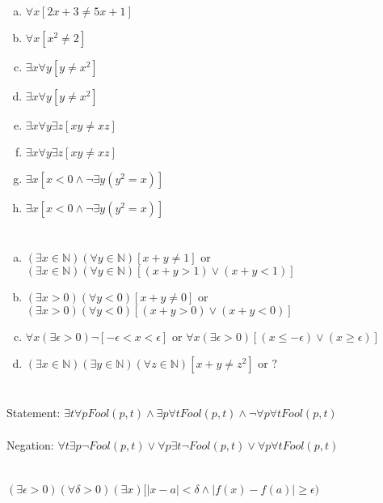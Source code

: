 \documentclass{article}
\begin{document}
\section{}

\begin{enumerate}[(a)]
\item $\forall x [2x + 3 \neq 5x + 1]$
\item $\forall x [x^2 \neq 2]$
\item $\exists x \forall y [y \neq x^2]$
\item $\exists x \forall y [y \neq x^2]$
\item $\exists x \forall y \exists z [xy \neq xz]$
\item $\exists x \forall y \exists z [xy \neq xz]$
\item $\exists x [x < 0 \wedge \neg \exists y (y^2 = x)]$
\item $\exists x [x < 0 \wedge \neg \exists y (y^2 = x)]$
\end{enumerate}

\section{}

\begin{enumerate}[(a)]
\item $(\exists x \in \mathbb{N})(\forall y \in \mathbb{N})[x + y \neq 1]$ or $(\exists x \in \mathbb{N})(\forall y \in \mathbb{N})[(x + y > 1) \vee (x + y  < 1)]$
\item $(\exists x > 0)(\forall y < 0)[x + y \neq 0]$ or $(\exists x > 0)(\forall y < 0)[(x + y > 0) \vee (x + y < 0)]$
\item $\forall x(\exists \epsilon> 0)\neg[-\epsilon < x < \epsilon]$ or $\forall x(\exists \epsilon> 0)[(x \leq -\epsilon) \vee (x \geq \epsilon)]$
\item $(\exists x \in \mathbb{N})(\exists y \in \mathbb{N})(\forall z \in \mathbb{N})[x + y \neq z^2]$ or $?$
\end{enumerate}

\section{}

Statement: $\exists t \forall p Fool(p, t) \wedge \exists p \forall t Fool(p, t) \wedge \neg \forall p \forall t Fool(p, t)$
\\\\
Negation: $\forall t \exists p \neg Fool(p, t) \vee \forall p \exists t \neg Fool(p, t) \vee \forall p \forall t Fool(p, t)$

\section{}

$(\exists \epsilon > 0)(\forall \delta > 0)(\exists x)[|x - a| < \delta \wedge |f(x) - f(a)| \geq \epsilon)$
\end{document}
